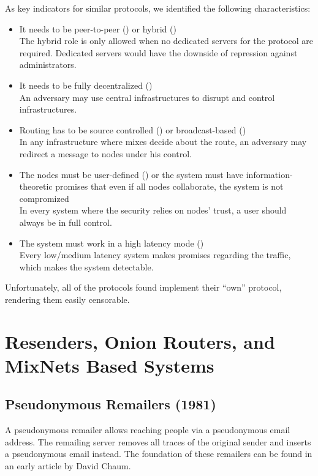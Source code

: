 As key indicators for similar protocols, we identified the following characteristics:
\begin{itemize}
	\item It needs to be peer-to-peer (\rolePtp) or hybrid (\roleHybrid)\\
	The hybrid role is only allowed when no dedicated servers for the protocol are required. Dedicated servers would have the downside of repression against administrators.
	\item It needs to be fully decentralized (\decentralizationDecentr)\\
	An adversary may use central infrastructures to disrupt and control infrastructures.
	\item Routing has to be source controlled (\routingRoutesrc) or broadcast-based (\routingRoutebc)\\
	In any infrastructure where mixes decide about the route, an adversary may redirect a message to nodes under his control.
	\item The nodes must be user-defined (\nsnodesusr) or the system must have information-theoretic promises that even if all nodes collaborate, the system is not compromized\\
	In every system where the security relies on nodes' trust, a user should always be in full control.
	\item The system must work in a high latency mode (\perflath)\\
	Every low/medium latency system makes promises regarding the traffic, which makes the system detectable.
\end{itemize}

Unfortunately, all of the protocols found implement their ``own'' protocol, rendering them easily censorable. 

\section{Resenders, Onion Routers, and MixNets Based Systems}\label{sec:remailersAndMixnets}
\subsection{Pseudonymous Remailers (1981)\label{sec:remPseudo}}
A pseudonymous remailer allows reaching people via a pseudonymous email address. The remailing server removes all traces of the original sender and inserts a pseudonymous email instead. The foundation of these remailers can be found in an early article by David Chaum\cite{CHAUM1}.


